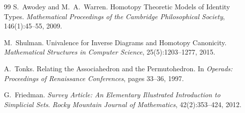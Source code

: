 \documentclass[11pt,a4paper]{article}
\theoremstyle{plain}
\theoremstyle{definition}
\theoremstyle{remark}
\begin{document}
\begin{thebibliography}{99}
S.~Awodey and M.~A.~Warren.
\newblock Homotopy Theoretic Models of Identity Types.
\newblock \emph{Mathematical Proceedings of the Cambridge Philosophical Society}, 146(1):45--55, 2009.

M.~Shulman.
\newblock Univalence for Inverse Diagrams and Homotopy Canonicity.
\newblock \emph{Mathematical Structures in Computer Science}, 25(5):1203--1277, 2015.

A.~Tonks.
\newblock Relating the Associahedron and the Permutohedron.
\newblock In \emph{Operads: Proceedings of Renaissance Conferences}, pages 33--36, 1997.

G.~Friedman.
\newblock \emph{Survey Article: An Elementary Illustrated Introduction to Simplicial Sets}.
\newblock \emph{Rocky Mountain Journal of Mathematics}, 42(2):353--424, 2012.

\end{thebibliography}
\end{document}
